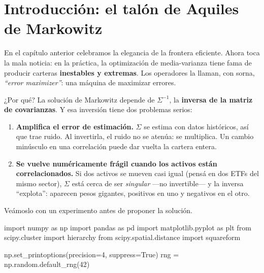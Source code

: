 \documentclass[
  spanish,
  letterpaper,
  DIV=11,
  numbers=noendperiod]{scrreprt}
\newenvironment{Shaded}{\begin{snugshade}}{\end{snugshade}}
\newcommand{\DecValTok}[1]{\textcolor[rgb]{0.68,0.00,0.00}{#1}}
\newcommand{\ImportTok}[1]{\textcolor[rgb]{0.00,0.46,0.62}{#1}}
\newcommand{\NormalTok}[1]{\textcolor[rgb]{0.00,0.23,0.31}{#1}}
\newcommand{\OperatorTok}[1]{\textcolor[rgb]{0.37,0.37,0.37}{#1}}
\newcommand{\VariableTok}[1]{\textcolor[rgb]{0.07,0.07,0.07}{#1}}
\providecommand{\tightlist}{%
  \setlength{\itemsep}{0pt}\setlength{\parskip}{0pt}}
\begin{document}
\hfill\break

\chapter{Introducción: el talón de Aquiles de
Markowitz}\label{introducciuxf3n-el-taluxf3n-de-aquiles-de-markowitz}

En el capítulo anterior celebramos la elegancia de la frontera
eficiente. Ahora toca la mala noticia: en la práctica, la optimización
de media-varianza tiene fama de producir carteras \textbf{inestables y
extremas}. Los operadores la llaman, con sorna, \emph{``error
maximizer''}: una máquina de maximizar errores.

¿Por qué? La solución de Markowitz depende de \(\Sigma^{-1}\), la
\textbf{inversa de la matriz de covarianzas}. Y esa inversión tiene dos
problemas serios:

\begin{enumerate}
\def\labelenumi{\arabic{enumi}.}
\tightlist
\item
  \textbf{Amplifica el error de estimación.} \(\Sigma\) se estima con
  datos históricos, así que trae ruido. Al invertirla, el ruido no se
  atenúa: se multiplica. Un cambio minúsculo en una correlación puede
  dar vuelta la cartera entera.
\item
  \textbf{Se vuelve numéricamente frágil cuando los activos están
  correlacionados.} Si dos activos se mueven casi igual (pensá en dos
  ETFs del mismo sector), \(\Sigma\) está cerca de ser \emph{singular}
  ---no invertible--- y la inversa ``explota'': aparecen pesos gigantes,
  positivos en uno y negativos en el otro.
\end{enumerate}

Veámoslo con un experimento antes de proponer la solución.

\label{setup}
\begin{Shaded}
\begin{Highlighting}[]
\ImportTok{import}\NormalTok{ numpy }\ImportTok{as}\NormalTok{ np}
\ImportTok{import}\NormalTok{ pandas }\ImportTok{as}\NormalTok{ pd}
\ImportTok{import}\NormalTok{ matplotlib.pyplot }\ImportTok{as}\NormalTok{ plt}
\ImportTok{from}\NormalTok{ scipy.cluster }\ImportTok{import}\NormalTok{ hierarchy}
\ImportTok{from}\NormalTok{ scipy.spatial.distance }\ImportTok{import}\NormalTok{ squareform}

\NormalTok{np.set\_printoptions(precision}\OperatorTok{=}\DecValTok{4}\NormalTok{, suppress}\OperatorTok{=}\VariableTok{True}\NormalTok{)}
\NormalTok{rng }\OperatorTok{=}\NormalTok{ np.random.default\_rng(}\DecValTok{42}\NormalTok{)}
\end{Highlighting}
\end{Shaded}
\end{document}
